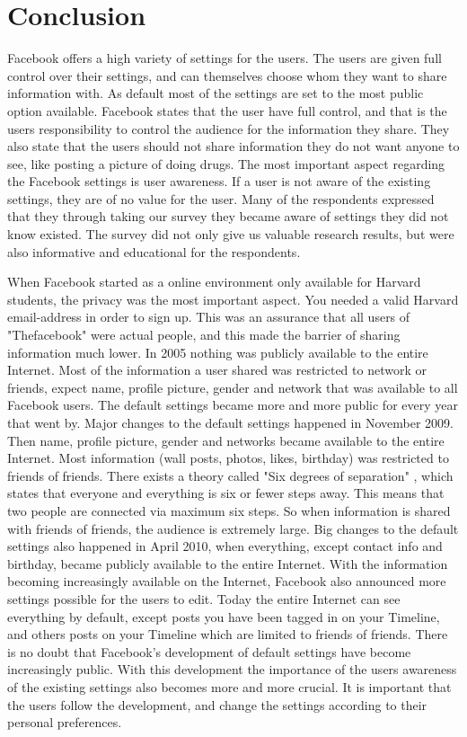 \chapter{Conclusion}
\label{chp:conclusion} 

Facebook offers a high variety of settings for the users. The users are given full control over their settings, and can themselves choose whom they want to share information with. As default most of the settings are set to the most public option available. Facebook states that the user have full control, and that is the users responsibility to control the audience for the information they share. They also state that the users should not share information they do not want anyone to see, like posting a picture of doing drugs. The most important aspect regarding the Facebook settings is user awareness. If a user is not aware of the existing settings, they are of no value for the user. Many of the respondents expressed that they through taking our survey they became aware of settings they did not know existed. The survey did not only give us valuable research results, but were also informative and educational for the respondents.  

When Facebook started as a online environment only available for Harvard students, the privacy was the most important aspect. You needed a valid Harvard email-address in order to sign up. This was an assurance that all users of "Thefacebook" were actual people, and this made the barrier of sharing information much lower. In 2005 nothing was publicly available to the entire Internet. Most of the information a user shared was restricted to network or friends, expect name, profile picture, gender and network that was available to all Facebook users. The default settings became more and more public for every year that went by. Major changes to the default settings happened in November 2009. Then name, profile picture, gender and networks became available to the entire Internet. Most information (wall posts, photos, likes, birthday) was restricted to friends of friends. There exists a theory called "Six degrees of separation" \cite{six}, which states that everyone and everything is six or fewer steps away. This means that two people are connected via maximum six steps. So when information is shared with friends of friends, the audience is extremely large. Big changes to the default settings also happened in April 2010, when everything, except contact info and birthday, became publicly available to the entire Internet. With the information becoming increasingly available on the Internet, Facebook also announced more settings possible for the users to edit. Today the entire Internet can see everything by default, except posts you have been tagged in on your Timeline, and others posts on your Timeline which are limited to friends of friends. There is no doubt that Facebook's development of default settings have become increasingly public. With this development the importance of the users awareness of the existing settings also becomes more and more crucial. It is important that the users follow the development, and change the settings according to their personal preferences. 

